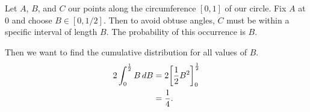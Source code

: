 \documentclass{tufte-handout}
\begin{document}
\bigskip

Let $A$, $B$, and $C$ our points along the circumference $[0,1]$ of
our circle. Fix $A$ at $0$ and choose $B \in [0,1/2]$. Then to avoid
obtuse angles, $C$ must be within a specific interval of length $B$. The
probability of this occurrence is $B$.

Then we want to find the cumulative distribution for all values of $B$.
\begin{align*}
  2\int_0^{1 \over 2} B \, dB
  &= 2{\left[ {1 \over 2} B^2 \right]}_0^{1 \over 2}\\
  &= {1 \over 4}.
\end{align*}
\end{document}
